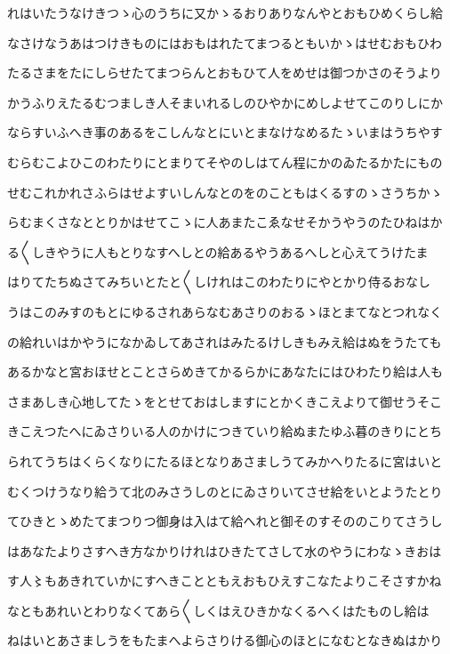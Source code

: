 \documentclass[a4paper,11pt,landscape]{ltjtarticle}
\begin{document}
れはいたうなけきつゝ心のうちに又かゝるおりありなんやとおもひめくらし給
\par\medskip
なさけなうあはつけきものにはおもはれたてまつるともいかゝはせむおもひわ
\par\medskip
たるさまをたにしらせたてまつらんとおもひて人をめせは御つかさのそうより
\par\medskip
かうふりえたるむつましき人そまいれるしのひやかにめしよせてこのりしにか
\par\medskip
ならすいふへき事のあるをこしんなとにいとまなけなめるたゝいまはうちやす
\par\medskip
むらむこよひこのわたりにとまりてそやのしはてん程にかのゐたるかたにもの
\par\medskip
せむこれかれさふらはせよすいしんなとのをのこともはくるすのゝさうちかゝ
\par\medskip
らむまくさなととりかはせてこゝに人あまたこゑなせそかうやうのたひねはか
\par\medskip
る〱しきやうに人もとりなすへしとの給あるやうあるへしと心えてうけたま
\par\medskip
はりてたちぬさてみちいとたと〱しけれはこのわたりにやとかり侍るおなし
\par\medskip
うはこのみすのもとにゆるされあらなむあさりのおるゝほとまてなとつれなく
\par\medskip
の給れいはかやうになかゐしてあされはみたるけしきもみえ給はぬをうたても
\par\medskip
あるかなと宮おほせとことさらめきてかるらかにあなたにはひわたり給は人も
\par\medskip
さまあしき心地してたゝをとせておはしますにとかくきこえよりて御せうそこ
\par\medskip
きこえつたへにゐさりいる人のかけにつきていり給ぬまたゆふ暮のきりにとち
\par\medskip
られてうちはくらくなりにたるほとなりあさましうてみかへりたるに宮はいと
\par\medskip
むくつけうなり給うて北のみさうしのとにゐさりいてさせ給をいとようたとり
\par\medskip
てひきとゝめたてまつりつ御身は入はて給へれと御そのすそののこりてさうし
\par\medskip
はあなたよりさすへき方なかりけれはひきたてさして水のやうにわなゝきおは
\par\medskip
す人〻もあきれていかにすへきことともえおもひえすこなたよりこそさすかね
\par\medskip
なともあれいとわりなくてあら〱しくはえひきかなくるへくはたものし給は
\par\medskip
ねはいとあさましうをもたまへよらさりける御心のほとになむとなきぬはかり
\end{document}
